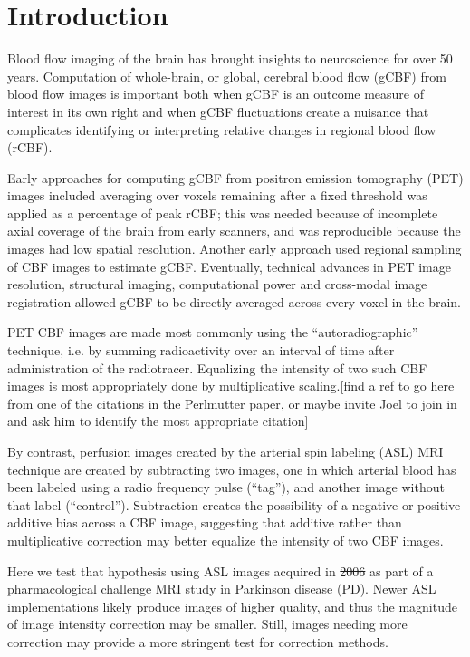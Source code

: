 \section{Introduction}
Blood flow imaging of the brain has brought insights to neuroscience for over 50 years.\cite{Taber_2005} Computation of whole-brain, or global, cerebral blood flow (gCBF) from blood flow images is important both when gCBF is an outcome measure of interest in its own right and when gCBF fluctuations create a nuisance that complicates identifying or interpreting relative changes in regional blood flow (rCBF).\cite{Small_2004} 

Early approaches for computing gCBF from positron emission tomography (PET) images included averaging over voxels remaining after a fixed threshold was applied as a percentage of peak rCBF; this was needed because of incomplete axial coverage of the brain from early scanners, and was reproducible because the images had low spatial resolution.\cite{6609680} Another early approach used regional sampling of CBF images to estimate gCBF.\cite{6971299}\cite{Perlmutter_1985} Eventually, technical advances in PET image resolution, structural imaging, computational power and cross-modal image registration allowed gCBF to be directly averaged across every voxel in the brain.

PET CBF images are made most commonly using the ``autoradiographic'' technique, i.e. by summing radioactivity over an interval of time after administration of the radiotracer. Equalizing the intensity of two such CBF images is most appropriately done by multiplicative scaling.[find a ref to go here from one of the citations in the Perlmutter paper, or maybe invite Joel to join in and ask him to identify the most appropriate citation] 

By contrast, perfusion images created by the arterial spin labeling (ASL) MRI technique are created by subtracting two images, one in which arterial blood has been labeled using a radio frequency pulse (``tag''), and another image without that label (``control''). Subtraction creates the possibility of a negative or positive additive bias across a CBF image, suggesting that additive rather than multiplicative correction may better equalize the intensity of two CBF images.

Here we test that hypothesis using ASL images acquired in \sout{2006} as part of a pharmacological challenge MRI study in Parkinson disease (PD). Newer ASL implementations likely produce images of higher quality, and thus the magnitude of image intensity correction may be smaller. Still, images needing more correction may provide a more stringent test for correction methods.